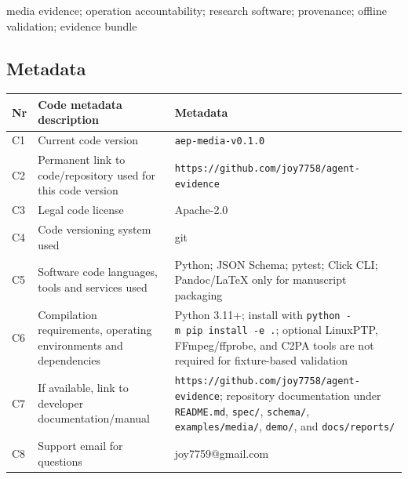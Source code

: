 \documentclass[
]{article}
\newcounter{none} %
\begin{document}
media evidence; operation accountability; research software; provenance;
offline validation; evidence bundle

\subsection{Metadata}\label{metadata}

{\def\LTcaptype{none} %
\begin{longtable}[]{@{}
  >{\raggedright\arraybackslash}p{}
  >{\raggedright\arraybackslash}p{}
  >{\raggedright\arraybackslash}p{}@{}}
\toprule\noalign{}
\begin{minipage}[b]{\linewidth}\raggedright
Nr
\end{minipage} & \begin{minipage}[b]{\linewidth}\raggedright
Code metadata description
\end{minipage} & \begin{minipage}[b]{\linewidth}\raggedright
Metadata
\end{minipage} \\
\midrule\noalign{}
\endhead
\bottomrule\noalign{}
\endlastfoot
C1 & Current code version & \texttt{aep-media-v0.1.0} \\
C2 & Permanent link to code/repository used for this code version &
\texttt{https://github.com/joy7758/agent-evidence} \\
C3 & Legal code license & Apache-2.0 \\
C4 & Code versioning system used & git \\
C5 & Software code languages, tools and services used & Python; JSON
Schema; pytest; Click CLI; Pandoc/LaTeX only for manuscript packaging \\
C6 & Compilation requirements, operating environments and dependencies &
Python 3.11+; install with \texttt{python\ -m\ pip\ install\ -e\ .};
optional LinuxPTP, FFmpeg/ffprobe, and C2PA tools are not required for
fixture-based validation \\
C7 & If available, link to developer documentation/manual &
\texttt{https://github.com/joy7758/agent-evidence}; repository
documentation under \texttt{README.md}, \texttt{spec/},
\texttt{schema/}, \texttt{examples/media/}, \texttt{demo/}, and
\texttt{docs/reports/} \\
C8 & Support email for questions & joy7759@gmail.com \\
\end{longtable}
}
\end{document}
